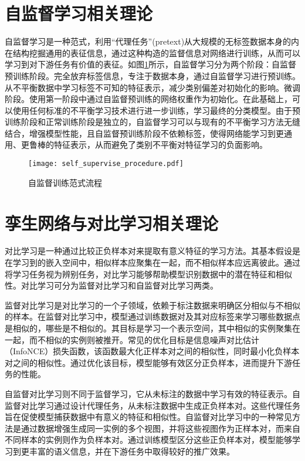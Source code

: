 \documentclass[master]{thesis-uestc}
\begin{document}
\section{自监督学习相关理论}
自监督学习是一种范式，利用“代理任务”(pretext)从大规模的无标签数据本身的内在结构挖掘通用的表征信息，通过这种构造的监督信息对网络进行训练，从而可以学习到对下游任务有价值的表征。如图\ref{self_supervise_procedure}所示，自监督学习分为两个阶段：自监督预训练阶段。完全放弃标签信息，专注于数据本身，通过自监督学习进行预训练。从不平衡数据中学习标签不可知的特征表示，减少类别偏差对初始化的影响。微调阶段。使用第一阶段中通过自监督预训练的网络权重作为初始化。在此基础上，可以使用任何标准的不平衡学习技术进行进一步训练，学习最终的分类模型。由于预训练阶段和正常训练阶段是独立的，自监督学习可以与现有的不平衡学习方法无缝结合，增强模型性能，且自监督预训练阶段不依赖标签，使得网络能学习到更通用、更鲁棒的特征表示，从而避免了类别不平衡对特征学习的负面影响。
\begin{figure}[h]
    \texttt{[image: self\_supervise\_procedure.pdf]}
    \caption{自监督训练范式流程}
    \label{self_supervise_procedure}
\end{figure}

\section{孪生网络与对比学习相关理论}
对比学习是一种通过比较正负样本对来提取有意义特征的学习方法。其基本假设是在学习到的嵌入空间中，相似样本应聚集在一起，而不相似样本应远离彼此。通过将学习任务视为辨别任务，对比学习能够帮助模型识别数据中的潜在特征和相似性。对比学习可分为监督对比学习和自监督对比学习两类。

监督对比学习是对比学习的一个子领域，依赖于标注数据来明确区分相似与不相似的样本。在监督对比学习中，模型通过训练数据对及其对应标签来学习哪些数据点是相似的，哪些是不相似的。其目标是学习一个表示空间，其中相似的实例聚集在一起，而不相似的实例则被推开。常见的优化目标是信息噪声对比估计（InfoNCE）损失函数，该函数最大化正样本对之间的相似性，同时最小化负样本对之间的相似性。通过优化该目标，模型能够有效区分正负样本，进而提升下游任务的性能。

自监督对比学习则不同于监督学习，它从未标注的数据中学习有效的特征表示。自监督对比学习通过设计代理任务，从未标注数据中生成正负样本对。这些代理任务旨在促使模型捕获数据中有意义的特征和相似性。自监督对比学习中的一种常见方法是通过数据增强生成同一实例的多个视图，并将这些视图作为正样本对，而来自不同样本的实例则作为负样本对。通过训练模型区分这些正负样本对，模型能够学习到更丰富的语义信息，并在下游任务中取得较好的推广效果。
\end{document}
